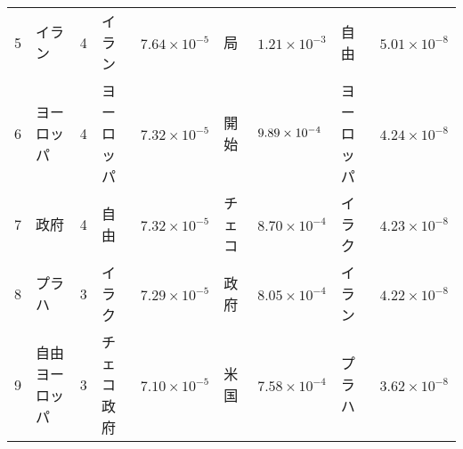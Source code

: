 \begin{table}[htbp]
\begin{center}
{\begin{tabular}{|r|ll|ll|ll|ll|}
  5	  & イラン         & \hspace{-2mm}4\hspace{-1.0mm} & イラン         & \hspace{-2mm}$7.64\times 10^{-5}$\hspace{-1.5mm} & 局      & \hspace{-2mm}$1.21\times 10^{-3}$\hspace{-1.5mm} & 自由            & \hspace{-2mm}$5.01\times 10^{-8}$\hspace{-1.5mm} \\
  6	  & ヨーロッパ     & \hspace{-2mm}4\hspace{-1.0mm} & ヨーロッパ     & \hspace{-2mm}$7.32\times 10^{-5}$\hspace{-1.5mm} & 開始    & \hspace{-2mm}$9.89\times 10^{-4}\hspace{-1.5mm}$ & ヨーロッパ      & \hspace{-2mm}$4.24\times 10^{-8}$\hspace{-1.5mm} \\
  7	  & 政府           & \hspace{-2mm}4\hspace{-1.0mm} & 自由           & \hspace{-2mm}$7.32\times 10^{-5}$\hspace{-1.5mm} & チェコ  & \hspace{-2mm}$8.70\times 10^{-4}$\hspace{-1.5mm} & イラク          & \hspace{-2mm}$4.23\times 10^{-8}$\hspace{-1.5mm} \\
  8	  & プラハ         & \hspace{-2mm}3\hspace{-1.0mm} & イラク         & \hspace{-2mm}$7.29\times 10^{-5}$\hspace{-1.5mm} & 政府    & \hspace{-2mm}$8.05\times 10^{-4}$\hspace{-1.5mm} & イラン          & \hspace{-2mm}$4.22\times 10^{-8}$\hspace{-1.5mm} \\
  9	  & 自由ヨーロッパ & \hspace{-2mm}3\hspace{-1.0mm} & チェコ政府     & \hspace{-2mm}$7.10\times 10^{-5}$\hspace{-1.5mm} & 米国    & \hspace{-2mm}$7.58\times 10^{-4}$\hspace{-1.5mm} & プラハ          & \hspace{-2mm}$3.62\times 10^{-8}$\hspace{-1.5mm} \\

\end{tabular}}
\end{center}
\end{table}
